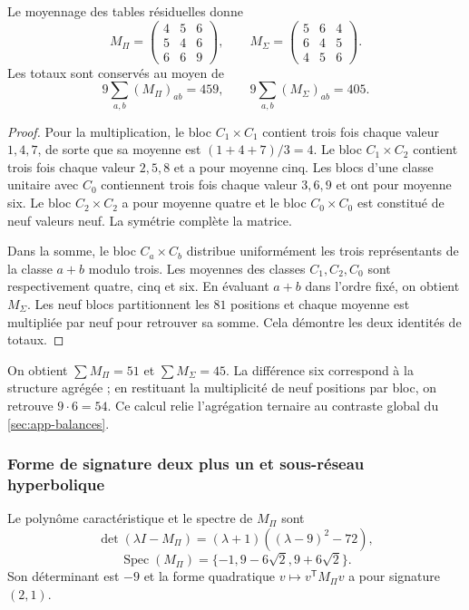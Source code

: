 \begin{proposicion}
\label{geo:prop-agregadas}
Le moyennage des tables résiduelles donne
\[
 M_\Pi=\begin{pmatrix}4&5&6\\5&4&6\\6&6&9\end{pmatrix},
 \qquad
 M_\Sigma=\begin{pmatrix}5&6&4\\6&4&5\\4&5&6\end{pmatrix}.
\]
Les totaux sont conservés au moyen de
\[
 9\sum_{a,b}(M_\Pi)_{ab}=459,
 \qquad9\sum_{a,b}(M_\Sigma)_{ab}=405.
\]
\end{proposicion}

\begin{proof}
Pour la multiplication, le bloc $C_1\times C_1$ contient trois fois chaque valeur $1,4,7$, de sorte que sa moyenne est $(1+4+7)/3=4$. Le bloc $C_1\times C_2$ contient trois fois chaque valeur $2,5,8$ et a pour moyenne cinq. Les blocs d'une classe unitaire avec $C_0$ contiennent trois fois chaque valeur $3,6,9$ et ont pour moyenne six. Le bloc $C_2\times C_2$ a pour moyenne quatre et le bloc $C_0\times C_0$ est constitué de neuf valeurs neuf. La symétrie complète la matrice.

Dans la somme, le bloc $C_a\times C_b$ distribue uniformément les trois représentants de la classe $a+b$ modulo trois. Les moyennes des classes $C_1,C_2,C_0$ sont respectivement quatre, cinq et six. En évaluant $a+b$ dans l'ordre fixé, on obtient $M_\Sigma$. Les neuf blocs partitionnent les $81$ positions et chaque moyenne est multipliée par neuf pour retrouver sa somme. Cela démontre les deux identités de totaux.
\end{proof}

On obtient $\sum M_\Pi=51$ et $\sum M_\Sigma=45$. La différence six correspond à la structure agrégée ; en restituant la multiplicité de neuf positions par bloc, on retrouve $9\cdot6=54$. Ce calcul relie l'agrégation ternaire au contraste global du \cref{sec:app-balances}.

\subsubsection{Forme de signature deux plus un et sous-réseau hyperbolique}

\begin{teorema}
\label{geo:thm-espectro-agregado}
Le polynôme caractéristique et le spectre de $M_\Pi$ sont
\[
 \det(\lambda I-M_\Pi)
 = (\lambda+1)((\lambda-9)^2-72),
\]
\[
 \operatorname{Spec}(M_\Pi)
 =\{-1,9-6\sqrt2,9+6\sqrt2\}.
\]
Son déterminant est $-9$ et la forme quadratique $v\mapsto v^{\mathsf T}M_\Pi v$ a pour signature $(2,1)$.
\end{teorema}


